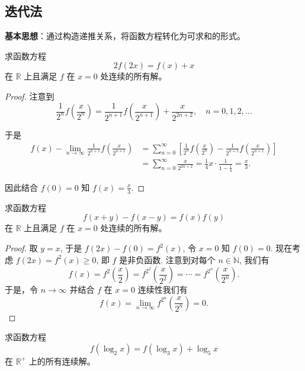 \documentclass[lang=cn,10pt,thmcnt=section]{elegantbook}
\begin{document}
\subsection{迭代法}
\textbf{基本思想}：通过构造递推关系，将函数方程转化为可求和的形式。
\begin{example}
	求函数方程 
\[ 2f(2x) = f(x) + x \]
在 $\mathbb{R}$ 上且满足 $f$ 在 $x=0$ 处连续的所有解。
\end{example}
\begin{proof}
	注意到
\[
\frac{1}{2^n}f\left(\frac{x}{2^n}\right) = \frac{1}{2^{n+1}}f\left(\frac{x}{2^{n+1}}\right) + \frac{x}{2^{2n+2}}, \quad n=0, 1, 2, \dots
\]

\noindent
于是
\begin{align*}
f(x) - \lim_{n\to\infty}\frac{1}{2^{n+1}}f\left(\frac{x}{2^{n+1}}\right) 
&= \sum_{n=0}^{\infty} \left[ \frac{1}{2^n}f\left(\frac{x}{2^n}\right) - \frac{1}{2^{n+1}}f\left(\frac{x}{2^{n+1}}\right) \right] \\
&= \sum_{n=0}^{\infty} \frac{x}{2^{2n+2}} = \frac{1}{4}x \cdot \frac{1}{1-\frac{1}{4}} = \frac{x}{3}.
\end{align*}

\noindent
因此结合 $f(0)=0$ 知 $f(x) = \frac{x}{3}$.
\end{proof}
\begin{example}
	求函数方程
\[ f(x+y) - f(x-y) = f(x)f(y) \]
在 $\mathbb{R}$ 上且满足 $f$ 在 $x=0$ 处连续的所有解。
\end{example}
\begin{proof}
	取 $y=x$, 于是 $f(2x)-f(0)=f^2(x)$, 令 $x=0$ 知 $f(0)=0$. 现在考虑 $f(2x) = f^2(x) \ge 0$, 即 $f$ 是非负函数. 注意到对每个 $n \in \mathbb{N}$, 我们有
\begin{equation}
f(x) = f^{2}\left(\frac{x}{2}\right) = f^{2^2}\left(\frac{x}{2^2}\right) = \cdots = f^{2^n}\left(\frac{x}{2^n}\right). 
\end{equation}
于是，令 $n \to \infty$ 并结合 $f$ 在 $x=0$ 连续性我们有
\[
f(x) = \lim_{n\to\infty} f^{2^n}\left(\frac{x}{2^n}\right) = 0.
\]
\end{proof}
\begin{example}
	求函数方程 
    \[ f(\log_2 x) = f(\log_3 x) + \log_5 x \]
    在 \( \mathbb{R}^+ \) 上的所有连续解。
\end{example}
\end{document}
